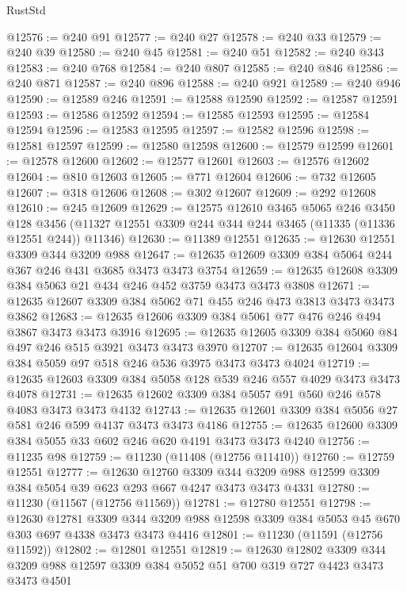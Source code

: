 \begin{lexlean}{RustStd}
\begin{coremodule}
{{{{{{{{{{{{{{{{{{{@12576 := @240 @91
@12577 := @240 @27
@12578 := @240 @33
@12579 := @240 @39
@12580 := @240 @45
@12581 := @240 @51
@12582 := @240 @343
@12583 := @240 @768
@12584 := @240 @807
@12585 := @240 @846
@12586 := @240 @871
@12587 := @240 @896
@12588 := @240 @921
@12589 := @240 @946
@12590 := @12589 @246
@12591 := @12588 @12590
@12592 := @12587 @12591
@12593 := @12586 @12592
@12594 := @12585 @12593
@12595 := @12584 @12594
@12596 := @12583 @12595
@12597 := @12582 @12596
@12598 := @12581 @12597
@12599 := @12580 @12598
@12600 := @12579 @12599
@12601 := @12578 @12600
@12602 := @12577 @12601
@12603 := @12576 @12602
@12604 := @810 @12603
@12605 := @771 @12604
@12606 := @732 @12605
@12607 := @318 @12606
@12608 := @302 @12607
@12609 := @292 @12608
@12610 := @245 @12609
@12629 := @12575
    @12610
    @3465
    @5065
    @246
    @3450
    @128
    @3456
    (@11327 @12551 @3309 @244 @344 @244 @3465 (@11335 (@11336 @12551 @244)) @11346)
@12630 := @11389 @12551
@12635 := @12630 @12551 @3309 @344 @3209 @988
@12647 := @12635 @12609 @3309 @384 @5064 @244 @367 @246 @431 @3685 @3473 @3473 @3754
@12659 := @12635 @12608 @3309 @384 @5063 @21 @434 @246 @452 @3759 @3473 @3473 @3808
@12671 := @12635 @12607 @3309 @384 @5062 @71 @455 @246 @473 @3813 @3473 @3473 @3862
@12683 := @12635 @12606 @3309 @384 @5061 @77 @476 @246 @494 @3867 @3473 @3473 @3916
@12695 := @12635 @12605 @3309 @384 @5060 @84 @497 @246 @515 @3921 @3473 @3473 @3970
@12707 := @12635 @12604 @3309 @384 @5059 @97 @518 @246 @536 @3975 @3473 @3473 @4024
@12719 := @12635 @12603 @3309 @384 @5058 @128 @539 @246 @557 @4029 @3473 @3473 @4078
@12731 := @12635 @12602 @3309 @384 @5057 @91 @560 @246 @578 @4083 @3473 @3473 @4132
@12743 := @12635 @12601 @3309 @384 @5056 @27 @581 @246 @599 @4137 @3473 @3473 @4186
@12755 := @12635 @12600 @3309 @384 @5055 @33 @602 @246 @620 @4191 @3473 @3473 @4240
@12756 := @11235 @98
@12759 := @11230 (@11408 (@12756 @11410))
@12760 := @12759 @12551
@12777 := @12630
    @12760
    @3309
    @344
    @3209
    @988
    @12599
    @3309
    @384
    @5054
    @39
    @623
    @293
    @667
    @4247
    @3473
    @3473
    @4331
@12780 := @11230 (@11567 (@12756 @11569))
@12781 := @12780 @12551
@12798 := @12630
    @12781
    @3309
    @344
    @3209
    @988
    @12598
    @3309
    @384
    @5053
    @45
    @670
    @303
    @697
    @4338
    @3473
    @3473
    @4416
@12801 := @11230 (@11591 (@12756 @11592))
@12802 := @12801 @12551
@12819 := @12630
    @12802
    @3309
    @344
    @3209
    @988
    @12597
    @3309
    @384
    @5052
    @51
    @700
    @319
    @727
    @4423
    @3473
    @3473
    @4501
}}}}}}}}}}}}}}}}}}}
\end{coremodule}
\end{lexlean}
